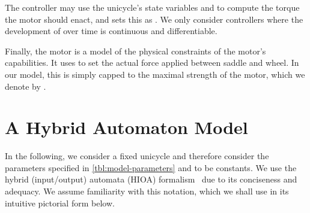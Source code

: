 \documentclass[copyright,submission]{eptcs}
\begin{document}
The controller may use the unicycle's state variables and
 to compute the torque the motor should enact, and
sets this as . We only consider controllers
where the development of  over time is
continuous and differentiable.

Finally, the motor is a  model of  the physical constraints of the
motor's capabilities. It uses  to set the actual
force  applied between saddle and wheel. In our model,
this is simply  capped to the maximal strength of
the motor, which we denote by .


\section{A Hybrid Automaton Model}
\label{sect:hioa}

In the following, we consider a fixed unicycle and therefore consider
the parameters specified in \cref{tbl:model-parameters} and
 to be constants.  We use the hybrid (input/output) automata (HIOA)
formalism~\cite{DonzeF13} due to its conciseness and adequacy. We
assume familiarity with this notation, which we shall use in its
intuitive pictorial form below.
\end{document}
